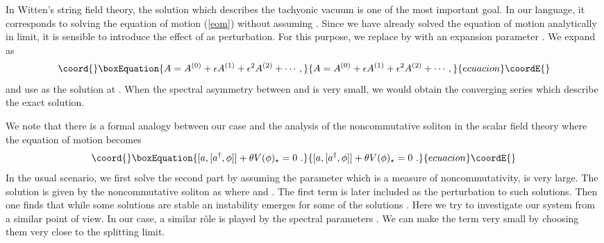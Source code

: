\documentclass[a4paper,aps,preprint,nofootinbib,eqsecnum]{revtex4}
\begin{document}
\label{perturbation} In Witten's string field theory, the solution which
describes the tachyonic vacuum is one of the most important goal. In our
language, it corresponds to solving the equation of motion (\ref{eom})
without assuming \coordHE{}. Since we have already solved the equation of
motion analytically in \coordHE{} limit, it is sensible to introduce the
effect of \myHighlight{$\gamma $}\coordHE{} as perturbation. For this purpose, we replace \myHighlight{$\gamma $}\coordHE{}
by \myHighlight{$\epsilon \gamma $}\coordHE{} with an expansion parameter \myHighlight{$\epsilon $}\coordHE{}. We expand \coordHE{}
as
\begin{equation}\coord{}\boxEquation{
A=A^{\left( 0\right) }+\epsilon A^{\left( 1\right) }+\epsilon ^{2}A^{\left(
2\right) }+\cdots ,  \label{expansion}
}{
A=A^{\left( 0\right) }+\epsilon A^{\left( 1\right) }+\epsilon ^{2}A^{\left(
2\right) }+\cdots ,  }{ecuacion}\coordE{}\end{equation}%
and use \coordHE{} as the solution at \coordHE{}. When the
spectral asymmetry between \coordHE{} and \coordHE{} is very small, we
would obtain the converging series which describe the exact solution.

We note that there is a formal analogy between our case and the analysis of
the noncommutative soliton in the scalar field theory where the equation of
motion becomes
\begin{equation}\coord{}\boxEquation{
\lbrack a,[a^{\dagger },\phi ]]+\theta V(\phi )_{\star }=0\,\,.
}{
\lbrack a,[a^{\dagger },\phi ]]+\theta V(\phi )_{\star }=0\,\,.
}{ecuacion}\coordE{}\end{equation}%
In the usual scenario, we first solve the second part by assuming the
parameter \myHighlight{$\theta ,$}\coordHE{} which is a measure of noncommutativity, is very large.
The solution is given by the noncommutative soliton as \coordHE{}
where \coordHE{} and \coordHE{}. The first
term is later included as the perturbation to such solutions. Then one finds
that while some solutions are stable an instability emerges for some of the
solutions \cite{soliton-stability}. Here we try to investigate our system
from a similar point of view. In our case, a similar r\^{o}le is played by
the spectral parameters \coordHE{}. We can make the \myHighlight{$\gamma $}\coordHE{} term very
small by choosing them very close to the splitting limit.
\end{document}
